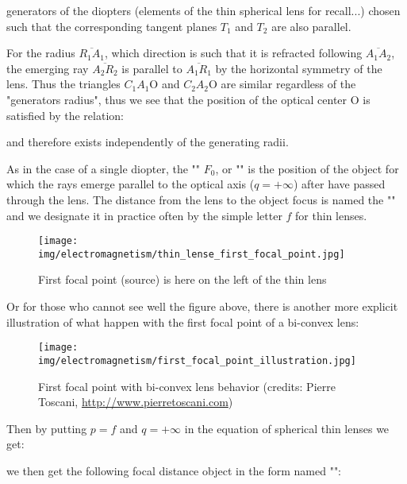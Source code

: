 	generators of the diopters (elements of the thin spherical lens for recall...) chosen such that the corresponding tangent planes $T_1$ and $T_2$ are also parallel.

	For the radius $\overline{R_1A_1}$, which direction is such that it is refracted following $\overline{A_1A_2}$, the emerging ray $\overline{A_2R_2}$ is parallel to $\overline{A_1R_1}$ by the horizontal symmetry of the lens. Thus the triangles $C_1A_1\text{O}$ and $C_2A_2\text{O}$ are similar regardless of the "generators radius", thus we see that the position of the optical center O is satisfied by the relation:
	
	and therefore exists independently of the generating radii.
	
	As in the case of a single diopter, the "" $F_0$, or "" is the position of the object for which the rays emerge parallel to the optical axis ($q=+\infty$) after have passed through the lens. The distance from the lens to the object focus is named the "" and we designate it in practice often by the simple letter $f$ for thin lenses.
	\begin{figure}[H]
		\centering
		\texttt{[image: img/electromagnetism/thin\_lense\_first\_focal\_point.jpg]}
		\caption{First focal point (source) is here on the left of the thin lens}
	\end{figure}
	Or for those who cannot see well the figure above, there is another more explicit illustration of what happen with the first focal point of a bi-convex lens:
	\begin{figure}[H]
		\centering
		\texttt{[image: img/electromagnetism/first\_focal\_point\_illustration.jpg]}
		\caption[First focal point with bi-convex lens behavior]{First focal point with bi-convex lens behavior (credits: Pierre Toscani, \url{http://www.pierretoscani.com})}
	\end{figure}
	Then by putting $p=f$ and $q=+\infty$ in the equation of spherical thin lenses we get:
	
	we then get the following focal distance object in the form named "":
	
